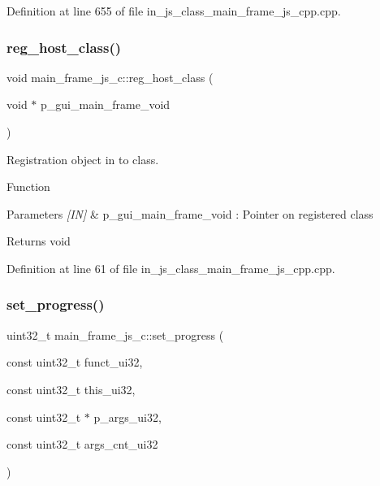 Definition at line 655 of file in\+\_\+js\+\_\+class\+\_\+main\+\_\+frame\+\_\+js\+\_\+cpp.\+cpp.

\mbox{\label{group__main__frame_ga37a1831c710f670520c335c1cfbae322}} 
\subsubsection{reg\_host\_class()}
{\footnotesize\ttfamily void main\+\_\+frame\+\_\+js\+\_\+c\+::reg\+\_\+host\+\_\+class (\begin{DoxyParamCaption}\item[{void $\ast$}]{p\+\_\+gui\+\_\+main\+\_\+frame\+\_\+void }\end{DoxyParamCaption})}



Registration object in to class. 

Function
\begin{DoxyParams}{Parameters}
{\em \mbox{[}\+I\+N\mbox{]}} & p\+\_\+gui\+\_\+main\+\_\+frame\+\_\+void \+: Pointer on registered class \\
\hline
\end{DoxyParams}
\begin{DoxyReturn}{Returns}
void 
\end{DoxyReturn}


Definition at line 61 of file in\+\_\+js\+\_\+class\+\_\+main\+\_\+frame\+\_\+js\+\_\+cpp.\+cpp.

\mbox{\label{group__main__frame_ga5aca35cb7955c58c76369bb6a06fb698}} 
\subsubsection{set\_progress()}
{\footnotesize\ttfamily uint32\+\_\+t main\+\_\+frame\+\_\+js\+\_\+c\+::set\+\_\+progress (\begin{DoxyParamCaption}\item[{const uint32\+\_\+t}]{funct\+\_\+ui32,  }\item[{const uint32\+\_\+t}]{this\+\_\+ui32,  }\item[{const uint32\+\_\+t $\ast$}]{p\+\_\+args\+\_\+ui32,  }\item[{const uint32\+\_\+t}]{args\+\_\+cnt\+\_\+ui32 }\end{DoxyParamCaption})\hspace{0.3cm}{\ttfamily [static]}}



